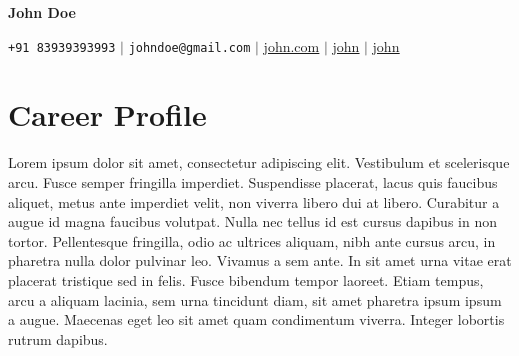 \documentclass[letterpaper,11pt]{article}
\begin{document}
\begin{center}

    \textbf{\Huge John Doe} \\ \vspace{2pt}

    \small \faPhone* \texttt{+91 83939393993} \hspace{1pt} $|$
    \hspace{1pt} \faEnvelope \hspace{2pt} \texttt{johndoe@gmail.com} \hspace{1pt} $|$ 
    \hspace{1pt} \faLink \hspace{2pt} \href{https://john.com}{\uline{john.com}} \hspace{1pt}  $|$ 
    \hspace{1pt} \faGithub \hspace{2pt} \href{https://github.com/john}{\uline{john}}  $|$ 
    \hspace{1pt} \faLinkedin \hspace{2pt} \href{https://www.linkedin.com/in/john/}{\uline{john}}  
\end{center}

\section{Career Profile}

Lorem ipsum dolor sit amet, consectetur adipiscing elit. Vestibulum et scelerisque arcu. Fusce semper fringilla imperdiet. Suspendisse placerat, lacus quis faucibus aliquet, metus ante imperdiet velit, non viverra libero dui at libero. Curabitur a augue id magna faucibus volutpat. Nulla nec tellus id est cursus dapibus in non tortor. Pellentesque fringilla, odio ac ultrices aliquam, nibh ante cursus arcu, in pharetra nulla dolor pulvinar leo. Vivamus a sem ante. In sit amet urna vitae erat placerat tristique sed in felis. Fusce bibendum tempor laoreet. Etiam tempus, arcu a aliquam lacinia, sem urna tincidunt diam, sit amet pharetra ipsum ipsum a augue. Maecenas eget leo sit amet quam condimentum viverra. Integer lobortis rutrum dapibus.
\end{document}
